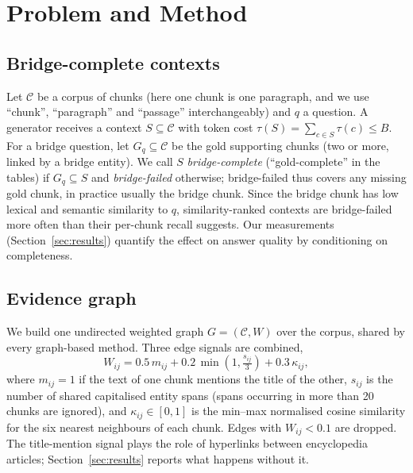 \section{Problem and Method}
\label{sec:method}

\subsection{Bridge-complete contexts}
Let $\mathcal{C}$ be a corpus of chunks (here one chunk is one paragraph, and we use ``chunk'', ``paragraph'' and ``passage'' interchangeably) and $q$ a question. A generator receives a context $S\subseteq\mathcal{C}$ with token cost $\tau(S)=\sum_{c\in S}\tau(c)\le B$. For a bridge question, let $G_q\subseteq\mathcal{C}$ be the gold supporting chunks (two or more, linked by a bridge entity). We call $S$ \emph{bridge-complete} (``gold-complete'' in the tables) if $G_q\subseteq S$ and \emph{bridge-failed} otherwise; bridge-failed thus covers any missing gold chunk, in practice usually the bridge chunk. Since the bridge chunk has low lexical and semantic similarity to $q$, similarity-ranked contexts are bridge-failed more often than their per-chunk recall suggests. Our measurements (Section~\ref{sec:results}) quantify the effect on answer quality by conditioning on completeness.

\subsection{Evidence graph}
We build one undirected weighted graph $G=(\mathcal{C},W)$ over the corpus, shared by every graph-based method. Three edge signals are combined,
\begin{equation}
W_{ij}=0.5\,m_{ij}+0.2\,\min\!\left(1,\tfrac{s_{ij}}{3}\right)+0.3\,\kappa_{ij},
\end{equation}
where $m_{ij}=1$ if the text of one chunk mentions the title of the other, $s_{ij}$ is the number of shared capitalised entity spans (spans occurring in more than 20 chunks are ignored), and $\kappa_{ij}\in[0,1]$ is the min--max normalised cosine similarity for the six nearest neighbours of each chunk. Edges with $W_{ij}<0.1$ are dropped. The title-mention signal plays the role of hyperlinks between encyclopedia articles; Section~\ref{sec:results} reports what happens without it.


